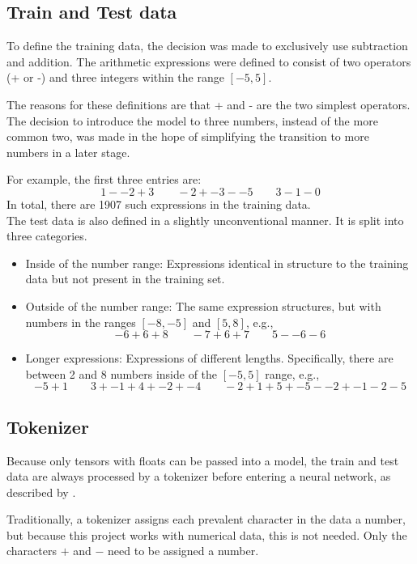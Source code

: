 \documentclass{article}
\begin{document}
\subsection{Train and Test data}
To define the training data, the decision was made to exclusively use subtraction and addition. The arithmetic expressions were defined to consist of two operators (+ or -) and three integers within the range $[-5, 5]$.

The reasons for these definitions are that + and - are the two simplest operators. The decision to introduce the model to three numbers, instead of the more common two, was made in the hope of simplifying the transition to more numbers in a later stage.

For example, the first three entries are:
\[
1 - -2 + 3 \qquad -2 + -3 - -5 \qquad 3 - 1 - 0
\]
{\small In total, there are 1907 such expressions in the training data.}
\\[2em]
The test data is also defined in a slightly unconventional manner. It is split into three categories.
\begin{itemize}
    \item Inside of the number range: Expressions identical in structure to the training data but not present in the training set.
    \item Outside of the number range: The same expression structures, but with numbers in the ranges $[-8, -5]$ and $[5, 8]$, e.g.,
\[
-6 + 6 + 8 \qquad -7 + 6 + 7 \qquad 5 - -6 - 6
\]
    \item Longer expressions: Expressions of different lengths. Specifically, there are between 2 and 8 numbers inside of the $[-5, 5]$ range, e.g.,
\[
-5 + 1 \qquad 3 + -1 + 4 + -2 + -4 \qquad -2 + 1 + 5 + -5 - -2 + -1 - 2 - 5
\]
\end{itemize}

\subsection{Tokenizer}

Because only tensors with floats can be passed into a model, the train and test data are always processed by a tokenizer before entering a neural network, as described by \cite{geeksforgeeks_nlp_tokenizing}.

Traditionally, a tokenizer assigns each prevalent character in the data a number, but because this project works with numerical data, this is not needed. Only the characters $+$ and $-$ need to be assigned a number.
\end{document}
